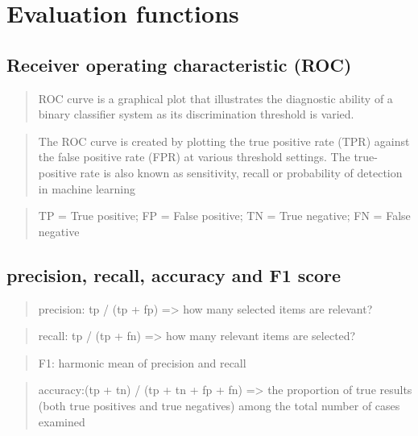 \documentclass[11pt]{article}
\begin{document}
    \section{Evaluation functions}\label{evaluation-functions}

\subsection{Receiver operating characteristic
(ROC)}\label{receiver-operating-characteristic-roc}

\begin{quote}
ROC curve is a graphical plot that illustrates the diagnostic ability of
a binary classifier system as its discrimination threshold is varied.
\end{quote}

\begin{quote}
The ROC curve is created by plotting the true positive rate (TPR)
against the false positive rate (FPR) at various threshold settings. The
true-positive rate is also known as sensitivity, recall or probability
of detection in machine learning
\end{quote}

\begin{quote}
TP = True positive; FP = False positive; TN = True negative; FN = False
negative
\end{quote}

\subsection{precision, recall, accuracy and F1
score}\label{precision-recall-accuracy-and-f1-score}

\begin{quote}
precision: tp / (tp + fp) =\textgreater{} how many selected items are
relevant?
\end{quote}

\begin{quote}
recall: tp / (tp + fn) =\textgreater{} how many relevant items are
selected?
\end{quote}

\begin{quote}
F1: harmonic mean of precision and recall
\end{quote}

\begin{quote}
accuracy:(tp + tn) / (tp + tn + fp + fn) =\textgreater{} the proportion
of true results (both true positives and true negatives) among the total
number of cases examined
\end{quote}
\end{document}
